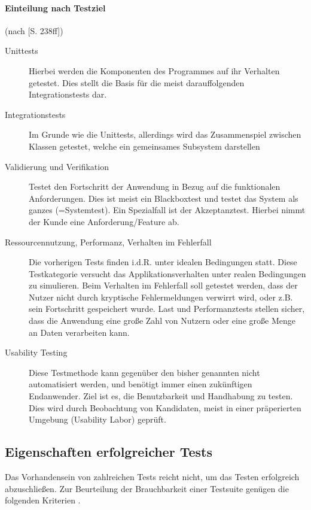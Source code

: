 \paragraph{Einteilung nach Testziel} (nach \cite{hunt_pragmatic_1999}[S. 238ff])
\begin{description}
 \item[Unittests] Hierbei werden die Komponenten des Programmes auf ihr Verhalten getestet. Dies stellt die Basis für die meist darauffolgenden Integrationstests dar.
 \item[Integrationstests] Im Grunde wie die Unittests, allerdings wird das Zusammenspiel zwischen Klassen getestet, welche ein gemeinsames Subsystem darstellen
 \item[Validierung und Verifikation] Testet den Fortschritt der Anwendung in Bezug auf die funktionalen Anforderungen. Dies ist meist ein Blackboxtest und testet das System als ganzes (=Systemtest). Ein Spezialfall ist der Akzeptanztest. Hierbei nimmt der Kunde eine Anforderung/Feature ab.
 \item[Ressourcennutzung, Performanz, Verhalten im Fehlerfall] Die vorherigen Tests finden i.d.R. unter idealen Bedingungen statt. Diese Testkategorie versucht das Applikationsverhalten unter realen Bedingungen zu simulieren. Beim Verhalten im Fehlerfall soll getestet werden, dass der Nutzer nicht durch kryptische Fehlermeldungen verwirrt wird, oder z.B. sein Fortschritt gespeichert wurde. Last und Performanztests stellen sicher, dass die Anwendung eine große Zahl von Nutzern oder eine große Menge an Daten verarbeiten kann.
 \item[Usability Testing] Diese Testmethode kann gegenüber den bisher genannten nicht automatisiert werden, und benötigt immer einen zukünftigen Endanwender. Ziel ist es, die Benutzbarkeit und Handhabung zu testen. Dies wird durch Beobachtung von Kandidaten, meist in einer präperierten Umgebung (Usability Labor) geprüft.
\end{description}




\subsection{Eigenschaften erfolgreicher Tests}

Das Vorhandensein von zahlreichen Tests reicht nicht, um das Testen erfolgreich abzuschließen. Zur Beurteilung der Brauchbarkeit einer Testsuite genügen die folgenden Kriterien \cite[S.272-279]{rappin_rails_2011}.

